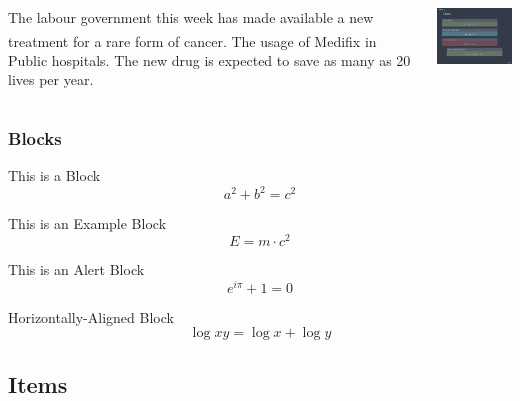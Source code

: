 \documentclass[aspectratio=169,compress]{beamer}
\begin{document}
\begin{frame}

    \begin{columns}[onlytextwidth,T]
      \column{\dimexpr\linewidth-60mm-5mm}

      The labour government this week has made available a new treatment
      for a rare form of cancer. The usage of
      Medifix\textsuperscript{\textregistered} in Public hospitals. The
      new drug is expected to save as many as 20 lives per year.

      \column{60mm}
      \includegraphics[width=60mm]{dark.png}

    \end{columns}

\end{frame}



\begin{frame}
  \frametitle{Blocks}
  \begin{block}{This is a Block}
    \[
      a^2 + b^2 = c^2
    \]
  \end{block}
  \begin{exampleblock}{This is an Example Block}
    \[
      E = m \cdot c^{2}
    \]
  \end{exampleblock}
  \begin{alertblock}{This is an Alert Block}
    \[
      e^{i\pi} + 1 = 0
    \]
  \end{alertblock}

  \centering
  \begin{minipage}{1.0\linewidth}
    \begin{block}{Horizontally-Aligned Block}
      \[
        \log xy = \log x + \log y
      \]
    \end{block}
  \end{minipage}
\end{frame}

\subsection{Items}
\end{document}
